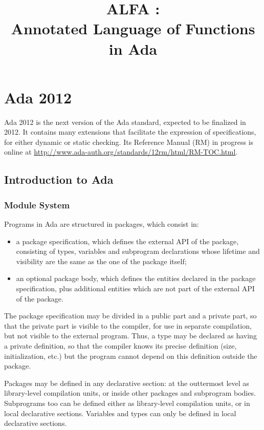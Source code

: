 \documentclass{article}
\title{ALFA \version:\\Annotated Language of Functions in Ada}
\begin{document}
\maketitle
\sloppy

\newpage

\setcounter{tocdepth}{2}
\tableofcontents

\newpage

\section{Ada 2012}

Ada 2012 is the next version of the Ada standard, expected to be finalized in
2012. It contains many extensions that facilitate the expression of
specifications, for either dynamic or static checking. Its Reference Manual
(RM) in progress is online at
\url{http://www.ada-auth.org/standards/12rm/html/RM-TOC.html}.

\subsection{Introduction to Ada}

\subsubsection{Module System}

Programs in Ada are structured in packages, which consist in:
\begin{itemize}
\item a package specification, which defines the external API of the package,
  consisting of types, variables and subprogram declarations whose lifetime and
  visibility are the same as the one of the package itself;
\item an optional package body, which defines the entities declared in the
  package specification, plus additional entities which are not part of the
  external API of the package.
\end{itemize}

The package specification may be divided in a public part and a private part,
so that the private part is visible to the compiler, for use in separate
compilation, but not visible to the external program. Thus, a type may be
declared as having a private definition, so that the compiler knows its precise
definition (size, initialization, etc.) but the program cannot depend on this
definition outside the package.

Packages may be defined in any declarative section: at the outtermost level as
library-level compilation units, or inside other packages and subprogram
bodies. Subprograms too can be defined either as library-level compilation
units, or in local declarative sections. Variables and types can only be
defined in local declarative sections.
\end{document}

